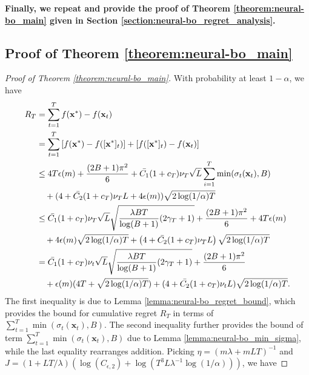 \noindent \textbf{Finally, we repeat and provide the proof of Theorem \ref{theorem:neural-bo_main} given in Section \ref{section:neural-bo_regret_analysis}.}
\subsection{Proof of Theorem \ref{theorem:neural-bo_main}}
\label{section:neural-bo_main_theorem_proof}
\NeuralBOTheorem*
\begin{proof} [Proof of Theorem \ref{theorem:neural-bo_main}]
With probability at least $1-\alpha$, we have
\begin{align*}
 R_T &  = \sum^T_{t=1} f(\mathbf{x^*}) - f(\mathbf{x}_t) \\ 
     & = \sum^T_{t=1} \left[f(\mathbf{x}^*) - f([\mathbf{x}^*]_t)\right] + \left[f([\mathbf{x}^*]_t) - f(\mathbf{x}_t) \right] \\ 
     &\leq 4T \epsilon(m) + \frac{(2B+1)\pi^2}{6} + \Bar{C_1}(1+c_T)\nu_T \sqrt{L} \sum^T_{i=1} \min(\sigma_t(\mathbf{x}_t), B) \\
     & \quad +(4+\Bar{C_2}(1+c_T)\nu_T L + 4\epsilon(m))\sqrt{2 \log(1/\alpha)T} \\
     & \leq \Bar{C_1}(1+c_T)\nu_T \sqrt{L} \sqrt{\frac{\lambda BT}{\log(B+1)} (2\gamma_T+1)} 
     + \frac{(2B+1)\pi^2}{6} + 4T \epsilon(m) \\
     & \quad + 4\epsilon(m)\sqrt{2 \log(1/\alpha)T}  +  \left(4+\Bar{C_2}(1+c_T)\nu_T L\right)\sqrt{2 \log(1/\alpha)T}  \\
     &  = \Bar{C_1}(1+c_T)\nu_t \sqrt{L} \sqrt{\frac{\lambda BT}{\log(B+1)} (2\gamma_T+1)} + \frac{(2B+1)\pi^2}{6} \\
     & \quad +  \epsilon(m)(4T+ \sqrt{2 \log(1/\alpha)T}) + (4+\Bar{C_2}(1+c_T)\nu_t L)\sqrt{2 \log(1/\alpha)T}.
     \end{align*} 
The first inequality is due to Lemma \ref{lemma:neural-bo_regret_bound}, which provides the bound for cumulative regret $R_T$ in terms of $\sum^T_{t=1} \min(\sigma_t(\mathbf{x}_t),B)$.  The second inequality further provides the bound of term $\sum^T_{t=1} \min(\sigma_t(\mathbf{x}_t),B)$ due to Lemma \ref{lemma:neural-bo_min_sigma}, while the last equality rearranges addition.   Picking $\eta = (m\lambda + mLT)^{-1}$ and $J = \left(1+LT/\lambda \right) \left(\log (C_{\epsilon,2} ) + \log(T^3L\lambda^{-1}\log(1/\alpha)) \right)$, we have 

\end{proof}
